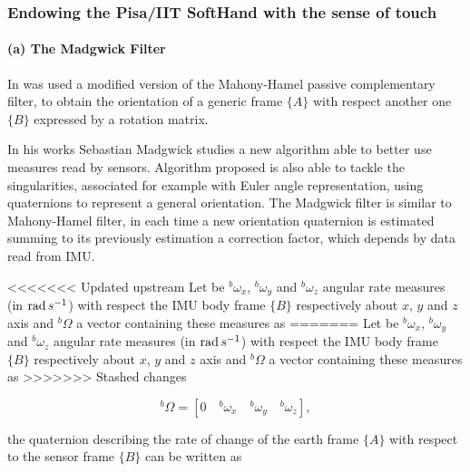 
\subsubsection{Endowing the Pisa/IIT SoftHand with the sense of touch}
\label{sec:SenseOfTouch}


\paragraph{(a) The Madgwick Filter}



In \cite{Santaera:ICRA:2015} was used a modified version of the Mahony-Hamel passive complementary filter, to obtain the orientation of a generic frame $\{ A \}$ with respect another one $\{ B \}$ expressed by a rotation matrix.  

In his works Sebastian Madgwick \cite{MadgwickMARG} studies a new algorithm able to better use measures read by sensors. Algorithm proposed is also able to tackle the singularities, associated for example with Euler angle representation, using quaternions to represent a general orientation. The Madgwick filter is similar to Mahony-Hamel filter, in each time a new orientation quaternion is estimated summing to its previously estimation a correction factor, which depends by
data read from IMU.

<<<<<<< Updated upstream
Let be ${^b\omega_x}$, ${^b\omega_y}$ and ${^b\omega_z}$ angular rate measures (in $\operatorname{rad} s^{-1}$) with respect the IMU body frame $\{ B\}$ respectively about $x$, $y$ and $z$ axis and $^{b}\Omega$ a vector containing these measures as
=======
Let be ${^b\omega_x}$, ${^b\omega_y}$ and ${^b\omega_z}$ angular rate measures (in $\operatorname{rad} s^{-1}$) with respect the IMU body frame $\{ B\}$ respectively about $x$, $y$ and $z$ axis and $^{b}\Omega$ a vector containing these measures as
>>>>>>> Stashed changes

\begin{equation}
\label{eq4_01}
^b \Omega = [ 0 \quad {^b\omega_x} \quad {^b\omega_y} \quad {^b\omega_z} ],
\end{equation}

\noindent the quaternion describing the rate of change of the earth frame $\{ A \}$ with respect to the sensor frame $\{ B \}$ can be written as

